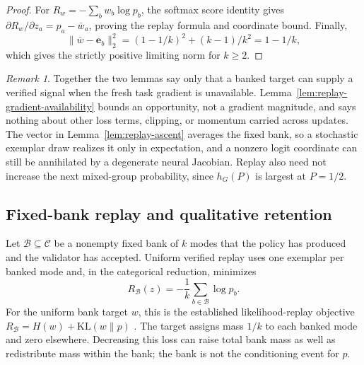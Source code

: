 \documentclass{article}
\newcommand{\enforcehalffinalproseline}{%
  \setlength{\parfillskip}{0pt plus .20\linewidth}}
\newcommand{\1}{\mathbf 1}
\theoremstyle{remark}
\newtheorem{remark}[lemma]{Remark}
\theoremstyle{definition}
\theoremstyle{plain}
\begin{document}
\begin{proof}
\enforcehalffinalproseline
For $R_w=-\sum_b w_b\log p_b$, the softmax score identity gives
$\partial R_w/\partial z_a=p_a-\bar w_a$, proving the replay formula and
coordinate bound. Finally,
\[
 \|\bar w-\mathbf e_b\|_2^2=(1-1/k)^2+(k-1)/k^2=1-1/k,
\]
which gives the strictly positive limiting norm for $k\ge2$.
\end{proof}

\begin{remark}
Together the two lemmas say only that a banked target can supply a verified
signal when the fresh task gradient is unavailable. Lemma~\ref{lem:replay-gradient-availability}
bounds an opportunity, not a gradient magnitude, and says nothing about other
loss terms, clipping, or momentum carried across updates. The vector in
Lemma~\ref{lem:replay-ascent} averages the fixed bank, so a stochastic
exemplar draw realizes it only in expectation, and a nonzero logit coordinate
can still be annihilated by a degenerate neural Jacobian. Replay also need not
increase the next mixed-group probability, since $h_G(P)$ is largest at
$P=1/2$.
\end{remark}

\subsection{Fixed-bank replay and qualitative retention}
\label{app:theory-replay}

Let $\mathcal B\subseteq\mathcal C$ be a nonempty fixed bank of $k$ modes that
the policy has produced and the validator has accepted. Uniform verified replay
uses one exemplar per banked mode and, in the categorical reduction, minimizes
\begin{equation}
  R_{\mathcal B}(z)
  =-\frac1k\sum_{b\in\mathcal B}\log p_b.
  \label{eq:verified-replay-loss}
\end{equation}
For the uniform bank target $w$, this is the established likelihood-replay
objective $R_{\mathcal B}=H(w)+\mathrm{KL}(w\|p)$
\citep[App.~D.1, version~4]{li2025divergence}. The target assigns mass
$1/k$ to each banked mode and zero elsewhere. Decreasing this loss can raise
total bank mass as well as redistribute mass within the bank; the bank is
not the conditioning event for $p$.
\end{document}
